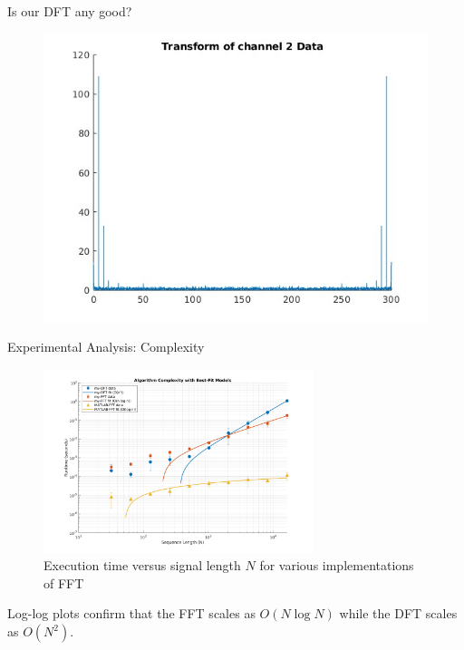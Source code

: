 \documentclass[10pt]{beamer}
\begin{document}
\begin{frame}{Is our DFT any good?}
\begin{figure}
    \begin{minipage}{0.4\textwidth}
      \centering
      \includegraphics[width=0.85\linewidth]{figures/matlab_fft.jpg}
      \label{fig:matlab}
    \end{minipage}
  \end{figure}
\end{frame}



\begin{frame}{Experimental Analysis: Complexity}
    \begin{figure}[h]
        \centering
        \includegraphics[width=0.7\textwidth]{figures/complex.jpg}
        \caption{Execution time versus signal length $N$ for various implementations of FFT}
        \label{fig:complexity}
    \end{figure}
Log-log plots confirm that the FFT scales as \(O(N \log N)\) while the DFT scales as \(O(N^2)\).
\end{frame}
\end{document}
